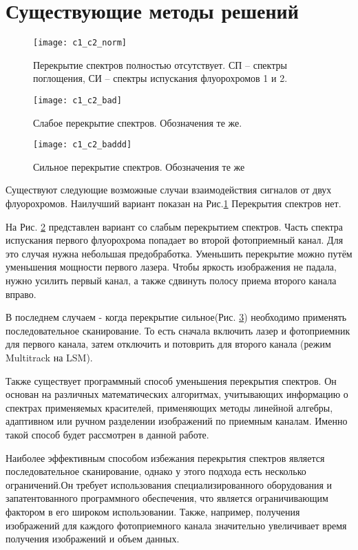 \section{Существующие методы решений} \label{ch1:sec4}
\begin{figure}[H]
	\centering
	\texttt{[image: c1\_c2\_norm]}
	\caption{Перекрытие спектров полностью отсутствует. СП –
		спектры поглощения, СИ – спектры испускания флуорохромов 1 и 2.}
	\label{c1_c2_norm}
\end{figure}

\begin{figure}[H]
	\centering
	\texttt{[image: c1\_c2\_bad]}
	\caption{Слабое перекрытие спектров. Обозначения те же.}
	\label{c1_c2_bad}
\end{figure}

\begin{figure}[H]
	\centering
	\texttt{[image: c1\_c2\_baddd]}
	\caption{Сильное перекрытие спектров. Обозначения те же}
	\label{c1_c2_baddd}
\end{figure}


Существуют следующие возможные случаи взаимодействия сигналов от двух
флуорохромов. Наилучший вариант показан на Рис.\ref{c1_c2_norm} Перекрытия
спектров нет.



На Рис. \ref{c1_c2_bad} представлен вариант со слабым перекрытием спектров. Часть
спектра испускания первого флуорохрома попадает во второй фотоприемный
канал. Для это случая нужна небольшая предобработка. Уменьшить перекрытие можно путём уменьшения мощности первого лазера. Чтобы  яркость изображения не падала, нужно усилить первый канал, а также сдвинуть полосу приема второго канала вправо.

 В последнем случаем - когда перекрытие сильное(Рис. \ref{c1_c2_baddd}) необходимо применять последовательное сканирование. То есть сначала включить лазер и фотоприемник для первого канала, затем отключить и потоврить для второго канала (режим Multitrack на LSM).
 
Также существует программный способ уменьшения перекрытия
спектров. Он основан на различных математических алгоритмах, учитывающих
информацию о спектрах применяемых красителей, применяющих методы
линейной алгебры, адаптивном или ручном разделении изображений по
приемным каналам. Именно такой способ будет рассмотрен в данной работе.

Наиболее эффективным способом избежания перекрытия спектров является последовательное сканирование, однако у этого подхода есть несколько ограничений.Он требует использования специализированного оборудования и запатентованного программного обеспечения, что является ограничивающим фактором в его широком использовании. Также, например, получения изображений для каждого фотоприемного канала значительно увеличивает время получения изображений и объем данных.




